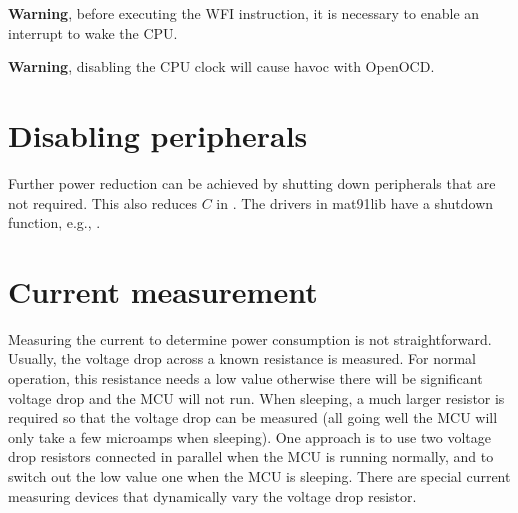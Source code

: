 \textbf{Warning}, before executing the WFI instruction, it is necessary
to enable an interrupt to wake the CPU.

\textbf{Warning}, disabling the CPU clock will cause havoc with
OpenOCD.


\section{Disabling peripherals}

Further power reduction can be achieved by shutting down peripherals
that are not required.  This also reduces $C$ in .  The
drivers in mat91lib have a shutdown function, e.g., .



\section{Current measurement}

Measuring the current to determine power consumption is not
straightforward.  Usually, the voltage drop across a known resistance
is measured.  For normal operation, this resistance needs a low value
otherwise there will be significant voltage drop and the MCU will not
run.  When sleeping, a much larger resistor is required so that the
voltage drop can be measured (all going well the MCU will only take a
few microamps when sleeping).  One approach is to use two voltage drop
resistors connected in parallel when the MCU is running normally, and
to switch out the low value one when the MCU is sleeping.  There are
special current measuring devices that dynamically vary the voltage
drop resistor.




